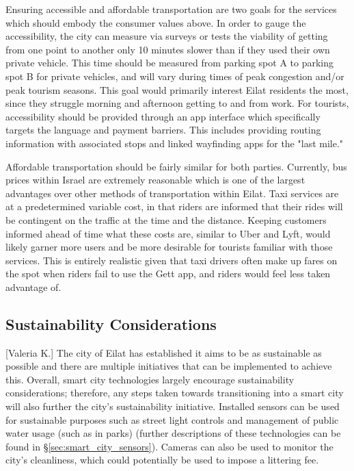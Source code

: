 \documentclass[12pt]{article}                               %
\begin{document}
Ensuring accessible and affordable transportation are two goals for the services which should embody the consumer values above. In order to gauge the accessibility, the city can measure via surveys or tests the viability of getting from one point to another only 10 minutes slower than if they used their own private vehicle. This time should be measured from parking spot A to parking spot B for private vehicles, and will vary during times of peak congestion and/or peak tourism seasons. This goal would primarily interest Eilat residents the most, since they struggle morning and afternoon getting to and from work. For tourists, accessibility should be provided through an app interface which specifically targets the language and payment barriers. This includes providing routing information with associated stops and linked wayfinding apps for the "last mile."

Affordable transportation should be fairly similar for both parties. Currently, bus prices within Israel are extremely reasonable which is one of the largest advantages over other methods of transportation within Eilat. Taxi services are at a predetermined variable cost, in that riders are informed that their rides will be contingent on the traffic at the time and the distance. Keeping customers informed ahead of time what these costs are, similar to Uber and Lyft, would likely garner more users and be more desirable for tourists familiar with those services. This is entirely realistic given that taxi drivers often make up fares on the spot when riders fail to use the Gett app, and riders would feel less taken advantage of.

\subsection{Sustainability Considerations}[Valeria K.]
The city of Eilat has established it aims to be as sustainable as possible and there are multiple initiatives that can be implemented to achieve this. Overall, smart city technologies largely encourage sustainability considerations; therefore, any steps taken towards transitioning into a smart city will also further the city's sustainability initiative. Installed sensors can be used for sustainable purposes such as street light controls and management of public water usage (such as in parks) (further descriptions of these technologies can be found in \S\ref{sec:smart_city_sensors}). Cameras can also be used to monitor the city's cleanliness, which could potentially be used to impose a littering fee. 
\end{document}
